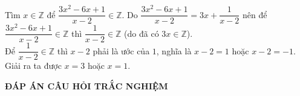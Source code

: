 	\begin{ex}%
		Tìm $ x \in \mathbb{Z} $ để $ \dfrac{3x^2-6x+1}{x-2} \in \mathbb{Z} $.
		\loigiai
		{
			Do $ \dfrac{3x^2-6x+1}{x-2}=3x+\dfrac{1}{x-2} $ nên để $\dfrac{3x^2-6x+1}{x-2} \in \mathbb{Z} $ thì $ \dfrac{1}{x-2} \in \mathbb{Z} $ (do đã có $ 3x \in \mathbb{Z} $).\\
			Để $ \dfrac{1}{x-2} \in \mathbb{Z} $ thì $ x-2 $ phải là ước của $ 1 $, nghĩa là $ x-2=1 $ hoặc $ x-2=-1 $.\\ Giải ra ta được $ x=3 $ hoặc $ x=1 $.
		}
	\end{ex}
	

	\begin{center}
		\textbf{ĐÁP ÁN CÂU HỎI TRẮC NGHIỆM}
	\end{center}
	\boxans
	